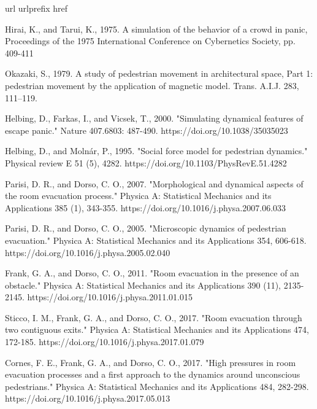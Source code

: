 \documentclass[preprint,12pt]{elsarticle}
\begin{document}
\begin{thebibliography}{10}
\expandafter\ifx\csname url\endcsname\relax
  \def\url#1{\texttt{#1}}\fi
\expandafter\ifx\csname urlprefix\endcsname\relax\def\urlprefix{URL }\fi
\expandafter\ifx\csname href\endcsname\relax
  \def\href#1#2{#2} \def\path#1{#1}\fi

Hirai, K., and Tarui, K., 1975. A simulation of the behavior of 
a crowd in panic, Proceedings of the 1975 International
Conference on Cybernetics Society, pp. 409-411
  
Okazaki, S., 1979. A study of pedestrian movement in 
architectural space, Part 
1: pedestrian movement by the application of magnetic model. Trans. A.I.J. 283, 
111–119.

Helbing, D., Farkas, I., and Vicsek, T., 2000. "Simulating dynamical 
features of escape panic." Nature 407.6803: 487-490. 
{\path{https://doi.org/10.1038/35035023}}

Helbing, D., and Moln\'ar, P., 1995. "Social force model for pedestrian 
dynamics." Physical review E 51 (5), 4282. 
{\path{https://doi.org/10.1103/PhysRevE.51.4282}}

Parisi, D. R., and Dorso, C. O., 2007. "Morphological and dynamical 
aspects of the room evacuation process." Physica A: Statistical Mechanics and 
its Applications 385 (1), 343-355. 
{\path{https://doi.org/10.1016/j.physa.2007.06.033}}

Parisi, D. R., and Dorso, C. O., 2005. "Microscopic dynamics of pedestrian 
evacuation." Physica A: Statistical Mechanics and its Applications 354, 
606-618. {\path{https://doi.org/10.1016/j.physa.2005.02.040}}

Frank, G. A., and Dorso, C. O., 2011. "Room evacuation in 
the presence of an obstacle." Physica A: Statistical Mechanics and its 
Applications 390 (11), 2135-2145. 
{\path{https://doi.org/10.1016/j.physa.2011.01.015}}

Sticco, I. M., Frank, G. A., and Dorso, C. O., 2017. "Room evacuation 
through two contiguous exits." Physica A: Statistical Mechanics and its 
Applications 474, 172-185. 
{\path{https://doi.org/10.1016/j.physa.2017.01.079}}

Cornes, F. E., Frank, G. A., and Dorso, C. O., 2017. "High pressures in room 
evacuation processes and a first approach to the dynamics around unconscious 
pedestrians." Physica A: Statistical Mechanics and its Applications 484, 
282-298. {\path{https://doi.org/10.1016/j.physa.2017.05.013}}


\end{thebibliography}
\end{document}
